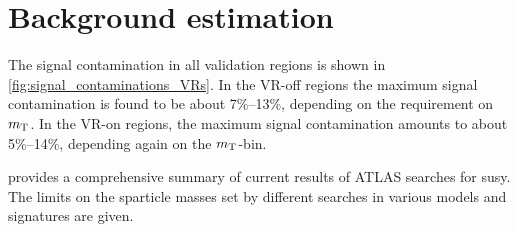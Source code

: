 \graphicspath{{chapter-background/Figs/}}

\section{Background estimation}\label{app:background_estimation}

The signal contamination in all validation regions is shown in \cref{fig:signal_contaminations_VRs}. In the VR-off regions the maximum signal contamination is found to be about 7\%--13\%, depending on the requirement on $m_{\textrm{T}}$. In the VR-on regions, the maximum signal contamination amounts to about 5\%--14\%, depending again on the $m_{\textrm{T}}$-bin.

 provides a comprehensive summary of current results of ATLAS searches for \gls{susy}. The limits on the sparticle masses set by different searches in various models and signatures are given.

